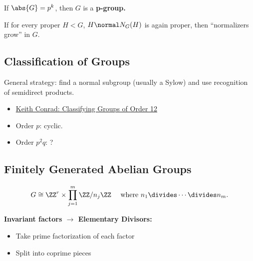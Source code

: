 \begin{definition}[p-groups]

If \(\abs{G} = p^k\), then \(G\) is a \textbf{p-group.}

\end{definition}

\begin{definition}

If for every proper \(H<G\), \(H\normal N_G(H)\) is again proper, then
``normalizers grow'' in \(G\).

\end{definition}

\hypertarget{classification-of-groups}{%
\subsection{Classification of Groups}\label{classification-of-groups}}

General strategy: find a normal subgroup (usually a Sylow) and use
recognition of semidirect products.

\begin{itemize}
\tightlist
\item
  \href{https://kconrad.math.uconn.edu/blurbs/grouptheory/group12.pdf}{Keith
  Conrad: Classifying Groups of Order 12}
\item
  Order \(p\): cyclic.
\item
  Order \(p^2q\): ?
\end{itemize}

\hypertarget{finitely-generated-abelian-groups}{%
\subsection{Finitely Generated Abelian
Groups}\label{finitely-generated-abelian-groups}}

\begin{definition}

\begin{align*}
G \cong \ZZ^r \times \prod_{j=1}^m \ZZ/n_j\ZZ
\quad \text{ where } n_1 \divides \cdots \divides n_m
.\end{align*}

\end{definition}

\textbf{Invariant factors \(\to\) Elementary Divisors:}

\begin{itemize}
\tightlist
\item
  Take prime factorization of each factor
\item
  Split into coprime pieces
\end{itemize}

